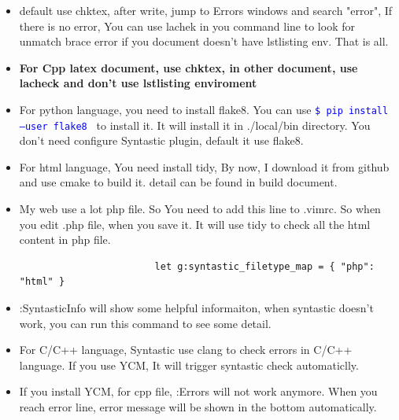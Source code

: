 \documentclass[paper=8.5in:11in, twoside, 12pt, pagesize=pdftex]{book}
\newcommand{\linuxcommand}[1]{\texttt{\textcolor{blue}{\$ #1 \Pisymbol{psy}{191}}}}
\begin{document}
\begin{itemize}
					\item default use chktex, after write, jump to Errors windows and search "error", If there is no error, You can use lachek in you command line to look for unmatch brace error if you document doesn't have lstlisting env. That is all.
					
					\item \textbf{For Cpp latex document, use chktex, in other document, use lacheck and don't use lstlisting enviroment}
					
					\item For python language, you need to install flake8. You can use \linuxcommand{pip install --user flake8} to install it. It will install it in ./local/bin directory. You don't need configure Syntastic plugin, default it use flake8.
					
					\item For html language, You need install tidy, By now, I download it from github and use cmake to build it. detail can be found in build document. 
					
					\item My web use a lot php file. So You need to add this line to .vimrc. So when you edit .php file, when you save it. It will use tidy to check all the html content in php file.
					\begin{verbatim}
						let g:syntastic_filetype_map = { "php": "html" }
					\end{verbatim}
					
					\item :SyntasticInfo will show some helpful informaiton, when syntastic doesn't work, you can run this command to see some detail. 
					
					\item For C/C++ language, Syntastic use clang to check errors in C/C++ language. If you use YCM, It will trigger syntastic check automaticlly.
					
					\item If you install YCM, for cpp file, :Errors will not work anymore. When you reach error line, error message will be shown in the bottom automatically. 
					
				\end{itemize}
				
\end{document}
